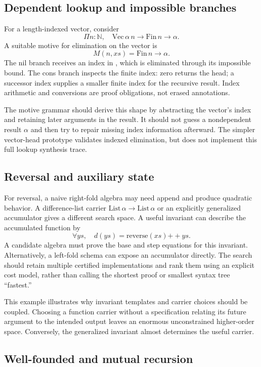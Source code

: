 \documentclass[11pt,letterpaper]{article}
\newcommand{\code}[1]{\texttt{\detokenize{#1}}}
\theoremstyle{definition}
\theoremstyle{remark}
\begin{document}
\subsection{Dependent lookup and impossible branches}

For a length-indexed vector, consider
\[
 \Pi n:\mathbb N,\quad \mathrm{Vec}\,\alpha\,n\to\mathrm{Fin}\,n\to\alpha.
\]
A suitable motive for elimination on the vector is
\[
 M(n,xs)=\mathrm{Fin}\,n\to\alpha.
\]
The nil branch receives an index in \code{Fin 0}, which is eliminated through its impossible bound. The cons branch inspects the finite index: zero returns the head; a successor index supplies a smaller finite index for the recursive result. Index arithmetic and conversions are proof obligations, not erased annotations.

The motive grammar should derive this shape by abstracting the vector's index and retaining later arguments in the result. It should not guess a nondependent result $\alpha$ and then try to repair missing index information afterward. The simpler vector-head prototype validates indexed elimination, but does not implement this full lookup synthesis trace.

\subsection{Reversal and auxiliary state}

For reversal, a naive right-fold algebra may need append and produce quadratic behavior. A difference-list carrier $\mathrm{List}\,\alpha\to\mathrm{List}\,\alpha$ or an explicitly generalized accumulator gives a different search space. A useful invariant can describe the accumulated function by
\[
 \forall ys,\quad d(ys)=\mathrm{reverse}(xs)\mathbin{++}ys.
\]
A candidate algebra must prove the base and step equations for this invariant. Alternatively, a left-fold schema can expose an accumulator directly. The search should retain multiple certified implementations and rank them using an explicit cost model, rather than calling the shortest proof or smallest syntax tree ``fastest.''

This example illustrates why invariant templates and carrier choices should be coupled. Choosing a function carrier without a specification relating its future argument to the intended output leaves an enormous unconstrained higher-order space. Conversely, the generalized invariant almost determines the useful carrier.

\subsection{Well-founded and mutual recursion}
\end{document}

